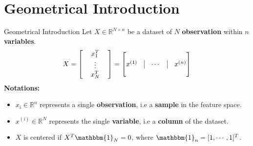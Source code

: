 \documentclass[10pt]{beamer}
\theoremstyle{definition}
\newcommand{\R}{\mathbb{R}}
\newcommand{\1}{\mathbbm{1}}
\begin{document}
\section{Geometrical Introduction}
\begin{frame}{Geometrical Introduction}
  Let $X \in \R^{N\times n}$ be a dataset of $N$
  {\bf observation} within $n$ {\bf variables}. 
  \begin{equation}
    X =
    \begin{bmatrix}
      \, & x_1 ^ T &\,\\
      \, & \vdots &\,\\
      \, & x_N ^ T &\,\\
    \end{bmatrix}
    =
    \begin{bmatrix}
      & & & \\
      x^{(1)} &\vline& \cdots& \vline& x^{(n)}\\
      & & & \\
    \end{bmatrix}
    \label{Geometrical view}
  \end{equation}
  {\bf Notations:}
  \begin{itemize}
    \item $x_i\in\R^n$ represents a single {\bf observation}, i.e a {\bf
      sample} in the feature space.
    \item $x^{(i)}\in\R^N$ represents the single {\bf variable}, i.e a {\bf
      column} of the dataset.
    \item $X$ is centered if $X^T\1_N=0$, where $\1_n=[1,\cdots,1]^T$.
  \end{itemize}
\end{frame}
\end{document}
